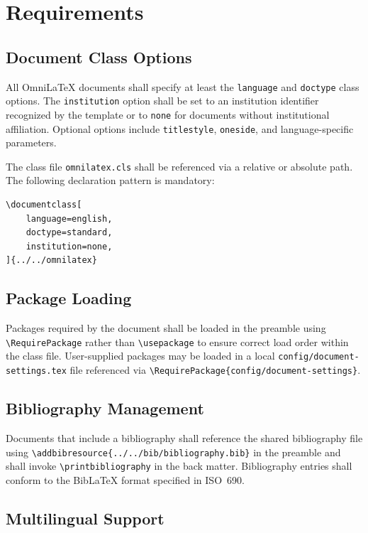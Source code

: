 \documentclass[
    language=english,
    doctype=standard,
    institution=none,
    titlestyle=book,
    oneside,
]{../../omnilatex}
\begin{document}
\section{Requirements}

\subsection{Document Class Options}

All OmniLaTeX documents shall specify at least the \texttt{language} and \texttt{doctype} class options. The \texttt{institution} option shall be set to an institution identifier recognized by the template or to \texttt{none} for documents without institutional affiliation. Optional options include \texttt{titlestyle}, \texttt{oneside}, and language-specific parameters.

The class file \texttt{omnilatex.cls} shall be referenced via a relative or absolute path. The following declaration pattern is mandatory:
\begin{verbatim}
\documentclass[
    language=english,
    doctype=standard,
    institution=none,
]{../../omnilatex}
\end{verbatim}

\subsection{Package Loading}

Packages required by the document shall be loaded in the preamble using \texttt{\textbackslash RequirePackage} rather than \texttt{\textbackslash usepackage} to ensure correct load order within the class file. User-supplied packages may be loaded in a local \texttt{config/document-settings.tex} file referenced via \texttt{\textbackslash RequirePackage\{config/document-settings\}}.

\subsection{Bibliography Management}

Documents that include a bibliography shall reference the shared bibliography file using \texttt{\textbackslash addbibresource\{../../bib/bibliography.bib\}} in the preamble and shall invoke \texttt{\textbackslash printbibliography} in the back matter. Bibliography entries shall conform to the Bib\LaTeX{} format specified in ISO~690.

\subsection{Multilingual Support}
\end{document}
